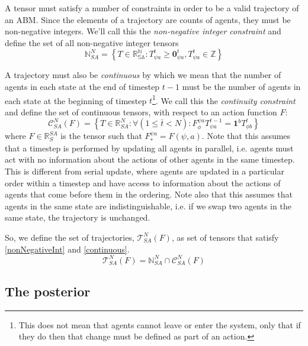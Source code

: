 \documentclass{article}
\begin{document}
A tensor must satisfy a number of constraints in order to be a valid trajectory of an ABM. Since the elements of a trajectory are counts of agents, they must be non-negative integers. We'll call this the \textit{non-negative integer constraint} and define the set of all non-negative integer tensors
\begin{equation}
\mathbb{N}^N_{SA} = \left\{ T \in \mathbb{R^N_{SA}}: T^t_{\psi a} \ge \mathbf{0}^t_{\psi a}, T^t_{\psi a} \in \mathbb{Z}\right\}
\label{nonNegativeInt}
\end{equation}

A trajectory must also be \textit{continuous} by which we mean that the number of agents in each state at the end of timestep $t-1$ must be the number of agents in each state at the beginning of timestep $t$\footnote{This does not mean that agents cannot leave or enter the system, only that if they do then that change must be defined as part of an action.}. We call this the \textit{continuity constraint} and define the set of continuous tensors, with respect to an action function $F$:
\begin{equation}
\mathcal{C}^N_{SA}(F) = \left\{T\in\mathbb{R}^N_{SA}:  \forall \left(  1 \le \bar t < N\right): F^{\psi a}_{\phi} T^{t-1}_{\psi a} = \mathbf{1}^bT^{t}_{\phi b}\right\}
\label{continuous}
\end{equation}
where $F \in \mathbb{R}^{SA}_S$ is the tensor such that  $F^{\psi a}_* = F(\psi, a)$. Note that this assumes that a timestep is performed by updating all agents in parallel, i.e. agents must act with no information about the actions of other agents in the same timestep. This is different from serial update, where agents are updated in a particular order within a timestep and have access to information about the actions of agents that come before them in the ordering. Note also that this assumes that agents in the same state are indistinguishable, i.e. if we swap two agents in the same state, the trajectory is unchanged.


So, we define the set of trajectories, $\mathcal{T}^N_{SA}(F)$, as set of tensors that satisfy \eqref{nonNegativeInt} and \eqref{continuous}.
\begin{equation}
\mathcal{T}^N_{SA}(F) = \mathbb{N}^N_{SA} \cap \mathcal{C}^N_{SA}(F)
\label{SetOfTrajectories}
\end{equation}


\subsection{The posterior}
\end{document}
